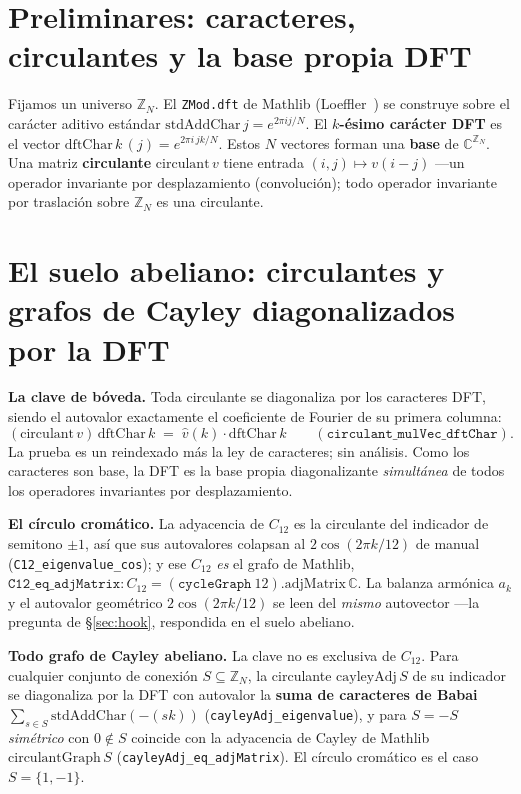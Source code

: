 \documentclass[11pt]{article}
\newcommand{\lean}[1]{\texttt{#1}}
\newcommand{\Zn}[1]{\mathbb{Z}_{#1}}
\begin{document}
\section{Preliminares: caracteres, circulantes y la base propia DFT}\label{sec:setup}

Fijamos un universo $\Zn{N}$. El \lean{ZMod.dft} de Mathlib (Loeffler~\cite{Loeffler}) se construye sobre el
car\'acter aditivo est\'andar $\mathrm{stdAddChar}\,j=e^{2\pi ij/N}$. El \textbf{$k$-\'esimo car\'acter DFT}
es el vector $\mathrm{dftChar}\,k\,(j)=e^{2\pi i\,jk/N}$. Estos $N$ vectores forman una \textbf{base} de
$\mathbb{C}^{\Zn{N}}$. Una matriz \textbf{circulante} $\mathrm{circulant}\,v$ tiene entrada
$(i,j)\mapsto v(i-j)$ ---un operador invariante por desplazamiento (convoluci\'on); todo operador invariante
por traslaci\'on sobre $\Zn{N}$ es una circulante.

\section{El suelo abeliano: circulantes y grafos de Cayley diagonalizados por la DFT}\label{sec:abelian}

\textbf{La clave de b\'oveda.} Toda circulante se diagonaliza por los caracteres DFT, siendo el autovalor
exactamente el coeficiente de Fourier de su primera columna:
\[
  (\mathrm{circulant}\,v)\,\mathrm{dftChar}\,k \;=\; \hat v(k)\cdot\mathrm{dftChar}\,k
  \qquad(\lean{circulant\_mulVec\_dftChar}).
\]
La prueba es un reindexado m\'as la ley de caracteres; sin an\'alisis. Como los caracteres son base, la DFT
es la base propia diagonalizante \emph{simult\'anea} de todos los operadores invariantes por desplazamiento.

\textbf{El c\'irculo crom\'atico.} La adyacencia de $C_{12}$ es la circulante del indicador de semitono
$\pm1$, as\'i que sus autovalores colapsan al $2\cos(2\pi k/12)$ de manual (\lean{C12\_eigenvalue\_cos}); y
ese $C_{12}$ \emph{es} el grafo de Mathlib,
$\lean{C12\_eq\_adjMatrix}: C_{12}=(\texttt{cycleGraph}\ 12).\mathrm{adjMatrix}\,\mathbb{C}$. La balanza
arm\'onica $a_k$ y el autovalor geom\'etrico $2\cos(2\pi k/12)$ se leen del \emph{mismo} autovector ---la
pregunta de \S\ref{sec:hook}, respondida en el suelo abeliano.

\textbf{Todo grafo de Cayley abeliano.} La clave no es exclusiva de $C_{12}$. Para cualquier conjunto de
conexi\'on $S\subseteq\Zn{N}$, la circulante $\mathrm{cayleyAdj}\,S$ de su indicador se diagonaliza por la
DFT con autovalor la \textbf{suma de caracteres de Babai}~\cite{Babai}
$\sum_{s\in S}\mathrm{stdAddChar}(-(sk))$ (\lean{cayleyAdj\_eigenvalue}), y para $S=-S$ \emph{sim\'etrico}
con $0\notin S$ coincide con la adyacencia de Cayley de Mathlib $\mathrm{circulantGraph}\,S$
(\lean{cayleyAdj\_eq\_adjMatrix}). El c\'irculo crom\'atico es el caso $S=\{1,-1\}$.
\end{document}
